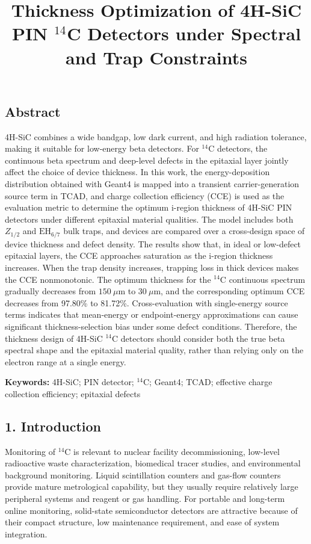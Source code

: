 \documentclass[
  10pt,
  a4paper,
]{article}
\title{Thickness Optimization of 4H-SiC PIN \(^{14}\)C Detectors under
Spectral and Trap Constraints}
\author{}
\date{}
\begin{document}
\maketitle

\subsection{Abstract}\label{abstract}

4H-SiC combines a wide bandgap, low dark current, and high radiation
tolerance, making it suitable for low-energy beta detectors. For
\(^{14}\mathrm{C}\) detectors, the continuous beta spectrum and
deep-level defects in the epitaxial layer jointly affect the choice of
device thickness. In this work, the energy-deposition distribution
obtained with Geant4 is mapped into a transient carrier-generation
source term in TCAD, and charge collection efficiency (CCE) is used as
the evaluation metric to determine the optimum i-region thickness of
4H-SiC PIN detectors under different epitaxial material qualities. The
model includes both \(Z_{1/2}\) and \(\mathrm{EH}_{6/7}\) bulk traps,
and devices are compared over a cross-design space of device thickness
and defect density. The results show that, in ideal or low-defect
epitaxial layers, the CCE approaches saturation as the i-region
thickness increases. When the trap density increases, trapping loss in
thick devices makes the CCE nonmonotonic. The optimum thickness for the
\(^{14}\mathrm{C}\) continuous spectrum gradually decreases from
\(150\ \mu\mathrm{m}\) to \(30\ \mu\mathrm{m}\), and the corresponding
optimum CCE decreases from 97.80\% to 81.72\%. Cross-evaluation with
single-energy source terms indicates that mean-energy or endpoint-energy
approximations can cause significant thickness-selection bias under some
defect conditions. Therefore, the thickness design of 4H-SiC
\(^{14}\mathrm{C}\) detectors should consider both the true beta
spectral shape and the epitaxial material quality, rather than relying
only on the electron range at a single energy.

\textbf{Keywords:} 4H-SiC; PIN detector; \(^{14}\mathrm{C}\); Geant4;
TCAD; effective charge collection efficiency; epitaxial defects

\subsection{1. Introduction}\label{introduction}

Monitoring of \(^{14}\mathrm{C}\) is relevant to nuclear facility
decommissioning, low-level radioactive waste characterization,
biomedical tracer studies, and environmental background monitoring.
Liquid scintillation counters and gas-flow counters provide mature
metrological capability, but they usually require relatively large
peripheral systems and reagent or gas handling. For portable and
long-term online monitoring, solid-state semiconductor detectors are
attractive because of their compact structure, low maintenance
requirement, and ease of system integration.
\end{document}
